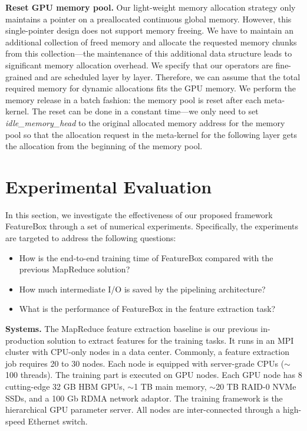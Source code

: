 \documentclass[sigconf]{acmart}
\begin{document}
\textbf{Reset GPU memory pool.} 
Our light-weight memory allocation strategy only maintains a pointer on a preallocated continuous global memory. However, this single-pointer design does not support memory freeing. 
We have to maintain an additional collection of freed memory and allocate the requested memory chunks from this collection---the maintenance of this additional data structure leads to significant memory allocation overhead. 
We specify that our operators are fine-grained and are scheduled layer by layer. 
Therefore, we can assume that the total required memory for dynamic allocations fits the GPU memory. 
We perform the memory release in a batch fashion: the memory pool is reset after each meta-kernel. The reset can be done in a constant time---we only need to set \textit{idle\_memory\_head} to the original allocated memory address for the memory pool so that the allocation request in the meta-kernel for the following layer gets the allocation from the beginning of the memory pool.



\section{Experimental Evaluation}
In this section, we investigate the effectiveness of our proposed framework FeatureBox through a set of numerical experiments. 
Specifically, the experiments are targeted to address the following questions:
\begin{itemize}
\item How is the end-to-end training time of FeatureBox compared with the previous MapReduce solution?
\item How much intermediate I/O is saved by the pipelining architecture?
\item What is the performance of FeatureBox in the feature extraction task?
\end{itemize}

\textbf{Systems.} 
The MapReduce feature extraction baseline is our previous in-production solution to extract features for the training tasks. It runs in an MPI cluster with CPU-only nodes in a data center. Commonly, a feature extraction job requires 20 to 30 nodes. Each node is equipped with server-grade CPUs ($\sim$100 threads). The training part is executed on GPU nodes. Each GPU node has 8 cutting-edge 32 GB HBM GPUs, $\sim$1 TB main memory, $\sim$20 TB RAID-0 NVMe SSDs, and a 100 Gb RDMA network adaptor. The training framework is the hierarchical GPU parameter server.
All nodes are inter-connected through a high-speed Ethernet switch. 
\end{document}
